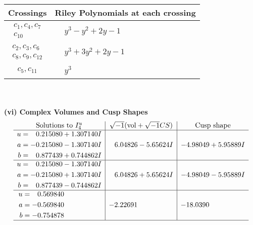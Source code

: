 \documentclass[1p]{elsarticle_modified}
\theoremstyle{definition}
\newcommand{\I}{\sqrt{-1}}
\begin{document}
\begin{tabular}{m{50pt}|m{274pt}}
Crossings & \hspace{64pt}Riley Polynomials at each crossing \\
\hline $$\begin{aligned}c_{1},c_{4},c_{7}\\c_{10}\end{aligned}$$&$\begin{aligned}
&y^3- y^2+2 y-1
\end{aligned}$\\
\hline $$\begin{aligned}c_{2},c_{3},c_{6}\\c_{8},c_{9},c_{12}\end{aligned}$$&$\begin{aligned}
&y^3+3 y^2+2 y-1
\end{aligned}$\\
\hline $$\begin{aligned}c_{5},c_{11}\end{aligned}$$&$\begin{aligned}
&y^3
\end{aligned}$\\
\hline
\end{tabular}\\~\\
\newpage\flushleft \textbf{(vi) Complex Volumes and Cusp Shapes}
$$\begin{array}{c|c|c}  
\text{Solutions to }I^u_{4}& \I (\text{vol} + \sqrt{-1}CS) & \text{Cusp shape}\\
 \hline 
\begin{aligned}
u &= \phantom{-}0.215080 + 1.307140 I \\
a &= -0.215080 - 1.307140 I \\
b &= \phantom{-}0.877439 + 0.744862 I\end{aligned}
 & \phantom{-}6.04826 - 5.65624 I & -4.98049 + 5.95889 I \\ \hline\begin{aligned}
u &= \phantom{-}0.215080 - 1.307140 I \\
a &= -0.215080 + 1.307140 I \\
b &= \phantom{-}0.877439 - 0.744862 I\end{aligned}
 & \phantom{-}6.04826 + 5.65624 I & -4.98049 - 5.95889 I \\ \hline\begin{aligned}
u &= \phantom{-}0.569840\phantom{ +0.000000I} \\
a &= -0.569840\phantom{ +0.000000I} \\
b &= -0.754878\phantom{ +0.000000I}\end{aligned}
 & -2.22691\phantom{ +0.000000I} & -18.0390\phantom{ +0.000000I}\\
 \hline 
 \end{array}$$\newpage
\end{document}
